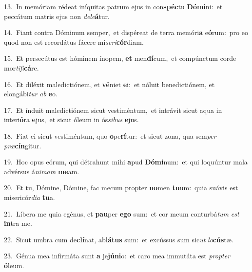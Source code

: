 {\numbfont\textcolor{\numbcolor}{13.}}~In memóriam rédeat iníquitas patrum ejus in con\-\textbf{spéc}\-tu \textbf{Dó}\-\textbf{mi}ni:~\star et peccátum matris ejus non \textit{de}\-\textit{le}\textbf{á}tur.\par
{\numbfont\textcolor{\numbcolor}{14.}}~Fiant contra Dóminum semper,~\dagger et dispéreat de terra memóri\textbf{a} e\-\textbf{ó}\-rum:~\star pro eo quod non est recordátus fácere mi\-\textit{se}\-\textit{ri}\textbf{cór}diam.\par
{\numbfont\textcolor{\numbcolor}{15.}}~Et persecútus est hóminem ínopem, \textbf{et} men\-\textbf{dí}\-cum,~\star et compúnctum corde mor\-\textit{ti}\-\textit{fi}\textbf{cá}re.\par
{\numbfont\textcolor{\numbcolor}{16.}}~Et diléxit maledictiónem, et \textbf{vé}\-niet \textbf{e}\-i:~\star et nóluit benedictiónem, et elongábi\textit{tur} \textit{ab} \textbf{e}\-o.\par
{\numbfont\textcolor{\numbcolor}{17.}}~Et índuit maledictiónem sicut vestiméntum,~\dagger et intrávit sicut aqua in interi\-\textbf{ó}\-ra \textbf{e}\-jus,~\star et sicut óleum in ós\-\textit{si}\-\textit{bus} \textbf{e}\-jus.\par
{\numbfont\textcolor{\numbcolor}{18.}}~Fiat ei sicut vestiméntum, quo \textbf{o}\-pe\-\textbf{rí}\-tur:~\star et sicut zona, qua sem\textit{per} \textit{præ}\-\textbf{cín}gitur.\par
{\numbfont\textcolor{\numbcolor}{19.}}~Hoc opus eórum, qui détrahunt mihi \textbf{a}\-pud \textbf{Dó}\-\textbf{mi}num:~\star et qui loquúntur mala advérsus á\-\textit{ni}\-\textit{mam} \textbf{me}\-am.\par
{\numbfont\textcolor{\numbcolor}{20.}}~Et tu, Dómine, Dómine, fac mecum propter \textbf{no}\-men \textbf{tu}\-um:~\star quia suávis est misericór\-\textit{di}\-\textit{a} \textbf{tu}\-a.\par
{\numbfont\textcolor{\numbcolor}{21.}}~Líbera me quia egénus, et \textbf{pau}\-per \textbf{e}\-\textbf{go} sum:~\star et cor meum conturbá\textit{tum} \textit{est} \textbf{in}\-tra me.\par
{\numbfont\textcolor{\numbcolor}{22.}}~Sicut umbra cum de\-\textbf{clí}\-nat, ab\-\textbf{lá}\-\textbf{tus} sum:~\star et excússus sum sic\textit{ut} \textit{lo}\-\textbf{cús}tæ.\par
{\numbfont\textcolor{\numbcolor}{23.}}~Génua mea infirmáta sunt \textbf{a} je\-\textbf{jú}\-\textbf{ni}o:~\star et caro mea immutáta est \textit{prop}\-\textit{ter} \textbf{ó}\-leum.\par
